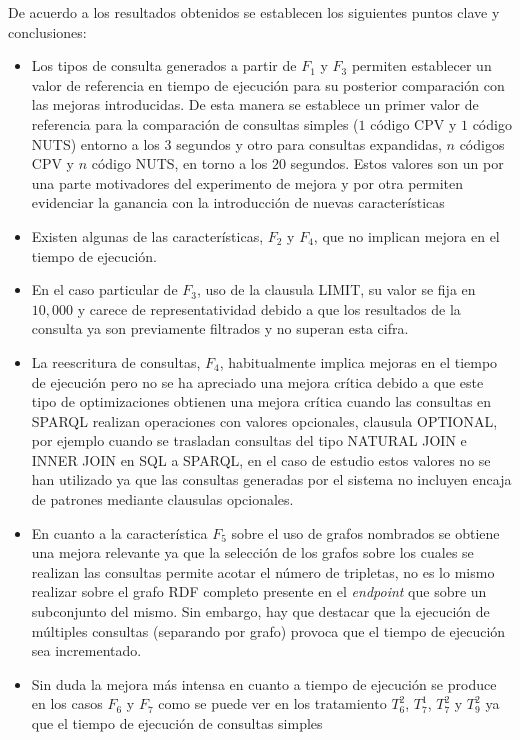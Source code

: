 De acuerdo a los resultados obtenidos se establecen los siguientes puntos clave y conclusiones:
\begin{itemize}
\item Los tipos de consulta generados a partir de $F_1$ y $F_3$ permiten establecer un valor de referencia 
en tiempo de ejecución para su posterior comparación con las mejoras introducidas. De esta manera se establece 
un primer valor de referencia para la comparación de consultas simples ($1$ código CPV y $1$ código NUTS) entorno 
a los $3$ segundos y otro para consultas expandidas, $n$ códigos CPV y $n$ código NUTS, en torno a los $20$ segundos. Estos 
valores son un por una parte motivadores del experimento de mejora y por otra permiten evidenciar la ganancia con la introducción 
de nuevas características 
 \item Existen algunas de las características, $F_2$ y $F_4$, que no implican mejora en el tiempo de ejecución. 
\item En el caso particular de $F_3$, uso de la clausula LIMIT, su valor se fija en $10,000$ y carece de representatividad debido a que los resultados 
de la consulta ya son previamente filtrados y no superan esta cifra.
\item La reescritura de consultas, $F_4$, habitualmente implica mejoras en el tiempo de ejecución pero no se ha apreciado una mejora 
crítica debido a que este tipo de optimizaciones obtienen una mejora crítica cuando las consultas en SPARQL realizan operaciones 
con valores opcionales, clausula OPTIONAL, por ejemplo cuando se trasladan consultas del tipo NATURAL JOIN e INNER JOIN en SQL a SPARQL, en el 
caso de estudio estos valores no se han utilizado ya que las consultas generadas por el sistema no incluyen encaja de patrones 
mediante clausulas opcionales.
\item En cuanto a la característica $F_5$ sobre el uso de grafos nombrados se obtiene una mejora relevante ya que la selección 
de los grafos sobre los cuales se realizan las consultas permite acotar el número de tripletas, no es lo mismo realizar sobre el 
grafo RDF completo presente en el \textit{endpoint} que sobre un subconjunto del mismo. Sin embargo, hay que destacar que la 
ejecución de múltiples consultas (separando por grafo) provoca que el tiempo de ejecución sea incrementado.
\item Sin duda la mejora más intensa en cuanto a tiempo de ejecución se produce en los casos $F_6$ y $F_7$ como se puede 
ver en los tratamiento $T^{2}_6$, $T^{1}_7$, $T^{2}_7$ y $T^{2}_9$ ya que el tiempo de ejecución de consultas simples 

\end{itemize}
